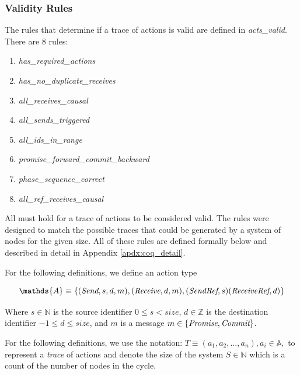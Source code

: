 \documentclass[runningheads]{llncs}
\newcommand{\send}{\emph{Send}}
\newcommand{\receive}{\emph{Receive}}
\newcommand{\sendref}{\emph{SendRef}}
\newcommand{\receiveref}{\emph{ReceiveRef}}
\newcommand{\action}{\mathds{A}}
\newcommand{\promise}{\emph{Promise}}
\newcommand{\commit}{\emph{Commit}}
\newif\ifcomments
\newif\ifkylecomments
\newcommand{\egm}[1]{\ifcomments\textcolor{orange}{egm: #1}\fi}
\newcommand{\krs}[1]{\ifkylecomments\textcolor{blue}{krs: #1}\fi}
\begin{document}
\subsubsection{Validity Rules} \label{sec:validity_rules}
The rules that determine if a trace of actions is valid are defined in \emph{acts\_valid}. There are 8 rules:

\begin{enumerate}
  \itemsep 0pt
  \item \emph{has\_required\_actions}
  \item \emph{has\_no\_duplicate\_receives}
  \item \emph{all\_receives\_causal}
  \item \emph{all\_sends\_triggered}
  \item \emph{all\_ids\_in\_range}
  \item \emph{promise\_forward\_commit\_backward}
  \item \emph{phase\_sequence\_correct}
  \item \emph{all\_ref\_receives\_causal}
\end{enumerate}

All must hold for a trace of actions to be considered valid. The rules were designed to match the possible traces that could be generated by a system of nodes for the given size. All of these rules are defined formally below and described in detail in Appendix \ref{apdx:coq_detail}.

\krs{I've been pretty good at using emph like $\emph{who}$ which is nice because it works in and out of math mode. Should I stay consistent with that? \egm{Here is a big tedious change. Text is math mode must be protected to keep LaTeX from formatting individual characters in a string as individual single letter variables. If not protected, then the string has strange spacing between characters. Protecting is easy: $who$ becomes $\mathit{who}$. That is it. There is also the `bf` and `rm` suffices for bold face and roman respectively. You need to make that change universally.}}
For the following definitions, we define an action type 
\begin{definition}
$$\action \equiv \{(\send, s, d, m), (\receive, d, m), (\sendref, s) (\receiveref, d)\}$$

Where $s \in \mathds{N}$ is the source identifier $0 \le s < size$, $d \in \mathds{Z}$ is the destination identifier $-1 \le d \le size$, and $m$ is a message $m \in \{\promise, \commit\}$.

\end{definition}
For the following definitions, we use the notation: 
$T \equiv (a_1, a_2, ..., a_n), a_i \in \action,$ to represent a \emph{trace} of actions and denote the size of the system $S \in \mathds{N}$ which is a count of the number of nodes in the cycle.
\end{document}

